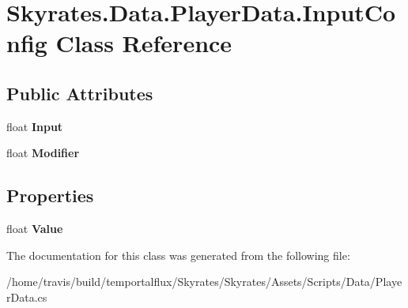 \hypertarget{class_skyrates_1_1_data_1_1_player_data_1_1_input_config}{\section{Skyrates.\-Data.\-Player\-Data.\-Input\-Config Class Reference}
\label{class_skyrates_1_1_data_1_1_player_data_1_1_input_config}
}
\subsection*{Public Attributes}
\begin{DoxyCompactItemize}
\item 
\hypertarget{class_skyrates_1_1_data_1_1_player_data_1_1_input_config_a65bb4825e79a6c29b533a2903dba38f5}{float {\bfseries Input}}\label{class_skyrates_1_1_data_1_1_player_data_1_1_input_config_a65bb4825e79a6c29b533a2903dba38f5}

\item 
\hypertarget{class_skyrates_1_1_data_1_1_player_data_1_1_input_config_aae67a8ffca2ec13266566c4ead9844a9}{float {\bfseries Modifier}}\label{class_skyrates_1_1_data_1_1_player_data_1_1_input_config_aae67a8ffca2ec13266566c4ead9844a9}

\end{DoxyCompactItemize}
\subsection*{Properties}
\begin{DoxyCompactItemize}
\item 
\hypertarget{class_skyrates_1_1_data_1_1_player_data_1_1_input_config_ac203745771f755afd2642e675a38a0c6}{float {\bfseries Value}}\label{class_skyrates_1_1_data_1_1_player_data_1_1_input_config_ac203745771f755afd2642e675a38a0c6}

\end{DoxyCompactItemize}


The documentation for this class was generated from the following file\-:\begin{DoxyCompactItemize}
\item 
/home/travis/build/temportalflux/\-Skyrates/\-Skyrates/\-Assets/\-Scripts/\-Data/Player\-Data.\-cs\end{DoxyCompactItemize}
